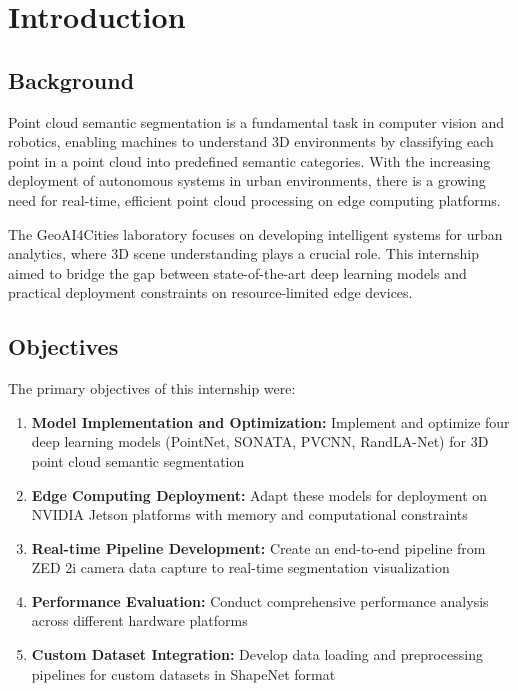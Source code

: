 \documentclass[12pt,a4paper]{report}
\begin{document}
\newpage
\tableofcontents
\newpage
\listoffigures
\newpage
\listoftables

\newpage
\chapter{Introduction}

\section{Background}

Point cloud semantic segmentation is a fundamental task in computer vision and robotics, enabling machines to understand 3D environments by classifying each point in a point cloud into predefined semantic categories. With the increasing deployment of autonomous systems in urban environments, there is a growing need for real-time, efficient point cloud processing on edge computing platforms.

The GeoAI4Cities laboratory focuses on developing intelligent systems for urban analytics, where 3D scene understanding plays a crucial role. This internship aimed to bridge the gap between state-of-the-art deep learning models and practical deployment constraints on resource-limited edge devices.

\section{Objectives}

The primary objectives of this internship were:

\begin{enumerate}
    \item \textbf{Model Implementation and Optimization:} Implement and optimize four deep learning models (PointNet, SONATA, PVCNN, RandLA-Net) for 3D point cloud semantic segmentation
    \item \textbf{Edge Computing Deployment:} Adapt these models for deployment on NVIDIA Jetson platforms with memory and computational constraints
    \item \textbf{Real-time Pipeline Development:} Create an end-to-end pipeline from ZED 2i camera data capture to real-time segmentation visualization
    \item \textbf{Performance Evaluation:} Conduct comprehensive performance analysis across different hardware platforms
    \item \textbf{Custom Dataset Integration:} Develop data loading and preprocessing pipelines for custom datasets in ShapeNet format
\end{enumerate}
\end{document}
